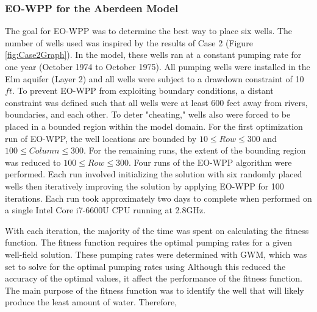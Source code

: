 \documentclass[authoryear]{elsarticle}
\begin{document}
\subsubsection{EO-WPP for the Aberdeen Model}
The goal for EO-WPP was to determine the best way to place six wells. The number of wells used was inspired by the results of Case 2 (Figure \ref{fig:Case2Graph}). In the model, these wells ran at a constant pumping rate for one year (October 1974 to October 1975). All pumping wells were installed in the Elm aquifer (Layer 2) and all wells were subject to a drawdown constraint of 10 $ft$. To prevent EO-WPP from exploiting boundary conditions, a distant constraint was defined such that all wells were at least 600 feet away from rivers, boundaries, and each other. To deter "cheating," wells also were forced to be placed in a bounded region within the model domain. For the first optimization run of EO-WPP, the well locations are bounded by $10\leq Row \leq 300$ and $100\leq Column \leq 300$. For the remaining runs, the extent of the bounding region was reduced to $100\leq Row \leq 300$. Four runs of the EO-WPP algorithm were performed. Each run involved initializing the solution with six randomly placed wells then iteratively improving the solution by applying EO-WPP for 100 iterations. Each run took approximately two days to complete when performed on a single Intel Core i7-6600U CPU running at 2.8GHz.

With each iteration, the majority of the time was spent on calculating the fitness function. The fitness function requires the optimal pumping rates for a given well-field solution. These pumping rates were determined with GWM, which was set to solve for the optimal pumping rates using   Although this reduced the accuracy of the optimal values, it  affect the performance of the fitness function. The main purpose of the fitness function was to identify the well that will likely produce the least amount of water. Therefore,  
\end{document}

